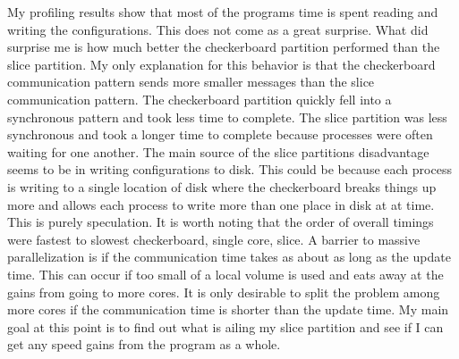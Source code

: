 \documentclass[11pt,a4paper,oneside]{report}
\begin{document}
My profiling results show that most of the programs time is spent reading and writing the configurations.  
This does not come as a great surprise.  
What did surprise me is how much better the checkerboard partition performed than the slice partition.  
My only explanation for this behavior is that the checkerboard communication pattern sends more smaller messages than the slice communication pattern.
The checkerboard partition quickly fell into a synchronous pattern and took less time to complete.  
The slice partition was less synchronous and took a longer time to complete because processes were often waiting for one another.
The main source of the slice partitions disadvantage seems to be in writing configurations to disk.
This could be because each process is writing to a single location of disk where the checkerboard breaks things up more and allows each process to write more than one place in disk at at time.
This is purely speculation.
It is worth noting that the order of overall timings were fastest to slowest checkerboard, single core, slice.
A barrier to massive parallelization is if the communication time takes as about as long as the update time. 
This can occur if too small of a local volume is used and eats away at the gains from going to more cores.
It is only desirable to split the problem among more cores if the communication time is shorter than the update time.
My main goal at this point is to find out what is ailing my slice partition and see if I can get any speed gains from the program as a whole.
\end{document}
